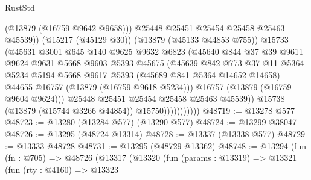 \begin{lexlean}{RustStd}
\begin{coremodule}
                                  (@13879 (@16759 @9642 @9658)))
                                @25448
                                @25451
                                @25454
                                @25458
                                @25463
                                @45539))
                            (@15217 (@45129 @30))
                            (@13879 (@45133 @44853 @755))
                            @15733
                            (@45631
                              @3001
                              @645
                              @140
                              @9625
                              @9632
                              @6823
                              (@45640
                                @844
                                @37
                                @39
                                @9611
                                @9624
                                @9631
                                @5668
                                @9603
                                @5393
                                @45675
                                (@45639
                                  @842
                                  @773
                                  @37
                                  @11
                                  @5364
                                  @5234
                                  @5194
                                  @5668
                                  @9617
                                  @5393
                                  (@45689 @841 @5364 @14652 @14658)
                                  @44655
                                  @16757
                                  (@13879 (@16759 @9618 @5234)))
                                @16757
                                (@13879 (@16759 @9604 @9624)))
                              @25448
                              @25451
                              @25454
                              @25458
                              @25463
                              @45539))
                          @15738
                          (@13879 (@15744 @3266 @44854))
                          @15750)))))))))))
@48719 := @13278 @577
@48723 := @13280 (@13284 @577) (@13290 @577)
@48724 := @13299 @38047
@48726 := @13295 (@48724 @13314)
@48728 := @13337 (@13338 @577)
@48729 := @13333 @48728
@48731 := @13295 (@48729 @13362)
@48748 := @13294
    (fun (fn : @705) =>
    @48726
      (@13317
        (@13320
          (fun (params : @13319) =>
          @13321
            (fun (rty : @4160) =>
            @13323

\end{coremodule}
\end{lexlean}
